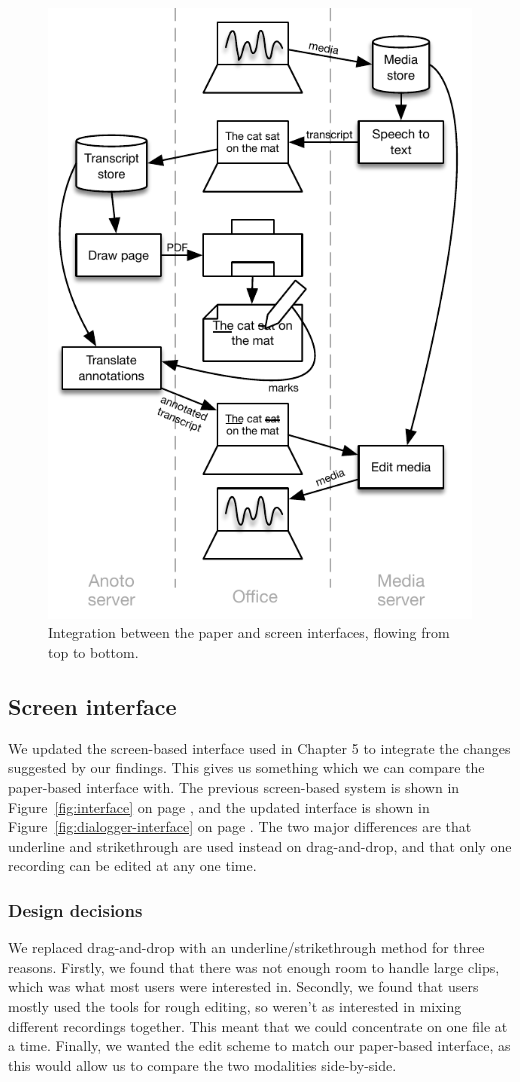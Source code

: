 \begin{figure}[ht]
  \centering
  \includegraphics[width=0.5\columnwidth]{figs/uist-sys-diagram}
  \caption{Integration between the paper and screen interfaces, flowing from top to bottom.}
  \label{fig:paper-screen-integration}
\end{figure}

\subsection{Screen interface}
We updated the screen-based interface used in Chapter 5 to integrate the changes suggested by our findings. This gives
us something which we can compare the paper-based interface with.
The previous screen-based system is shown in Figure~\ref{fig:interface} on page \pageref{fig:interface}, and the
updated interface is shown in Figure~\ref{fig:dialogger-interface} on page \pageref{fig:dialogger-interface}.
The two major differences are that underline and strikethrough are used instead on drag-and-drop, and that only one
recording can be edited at any one time.

\subsubsection{Design decisions}

We replaced drag-and-drop with an underline/strikethrough method for three reasons.
Firstly, we found that there was not enough room to handle large clips, which was what most users were interested in.
Secondly, we found that users mostly used the tools for rough editing, so weren't as interested in mixing different
recordings together. This meant that we could concentrate on one file at a time.
Finally, we wanted the edit scheme to match our paper-based interface, as this would allow us to compare the two
modalities side-by-side.

